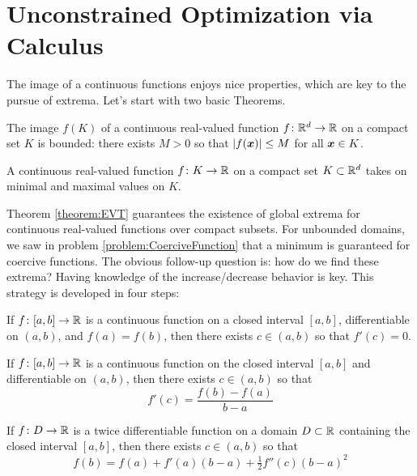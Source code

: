
\chapter{Unconstrained Optimization via Calculus}


The image of a continuous functions enjoys nice properties, which are key to the pursue of extrema.  Let's start with two basic Theorems.

\begin{theorem}\label{theorem:BVT}
The image $f(K)$ of a continuous real-valued function $f \colon \mathbb{R}^d \to \mathbb{R}$ on a compact set $K$ is bounded: there exists $M>0$ so that $\lvert  f(\boldsymbol{x})  \rvert \leq M$ for all $\boldsymbol{x} \in K$.
\end{theorem}

\begin{theorem}\label{theorem:EVT}
A continuous real-valued function $f \colon K \to \mathbb{R}$ on a compact set $K \subset \mathbb{R}^d$ takes on minimal and maximal values on $K$.
\end{theorem}

Theorem \ref{theorem:EVT} guarantees the existence of global extrema for continuous real-valued functions over compact subsets.  For unbounded domains, we saw in problem \ref{problem:CoerciveFunction} that a minimum is guaranteed for coercive functions.  The obvious follow-up question is: how do we find these extrema?  Having knowledge of the  increase/decrease behavior is key.  This strategy is developed in four steps:

\begin{theorem}\label{theorem:Rolle}
If $f\colon [a,b] \to \mathbb{R}$ is a continuous function on a closed interval $[a,b]$, differentiable on $(a,b)$, and $f(a) = f(b)$, then there exists $c \in (a,b)$ so that $f'(c)=0$.
\end{theorem}

\begin{theorem}\label{theorem:MVT}
If $f\colon [a,b] \to \mathbb{R}$ is a continuous function on the closed interval $[a,b]$ and differentiable on $(a,b)$, then there exists $c \in (a,b)$ so that
\begin{equation*}
f'(c) = \frac{f(b)-f(a)}{b-a}
\end{equation*}
\end{theorem}

\begin{theorem}\label{theorem:ELM}
If $f\colon D \to \mathbb{R}$ is a twice differentiable function on a domain $D \subset \mathbb{R}$ containing the closed interval $[a,b]$, then there exists $c \in (a,b)$ so that 
\begin{equation*}
f(b) = f(a) + f'(a)(b-a) + \tfrac{1}{2}f''(c)(b-a)^2
\end{equation*}
\end{theorem}

